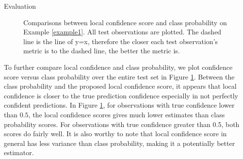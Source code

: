 \documentclass[12pt]{pom_thesis}
\begin{document}
\begin{chapter}{Evaluation}
\begin{figure}[h]
\centering
{}
\label{scores-example-1}
\caption{Comparisons between local confidence score and class probability on Example \ref{example1}. All test observations are plotted. The dashed line is the line of y=x, therefore the closer each test observation's metric is to the dashed line, the better the metric is.}
\end{figure}

To further compare local confidence and class probability, we plot confidence score versus class probability over the entire test set in Figure \ref{scores-example-1}. Between the class probability and the proposed local confidence score, it appears that local confidence is closer to the true prediction confidence especially in not perfectly confident predictions.  In Figure \ref{scores-example-1}, for observations with true confidence lower than $0.5$, the local confidence scores gives much lower estimates than class probability scores. For observations with true confidence greater than 0.5, both scores do fairly well. It is also worthy to note that local confidence score in general has less variance than class probability, making it a potentially better estimator. 



\end{chapter}
\end{document}
